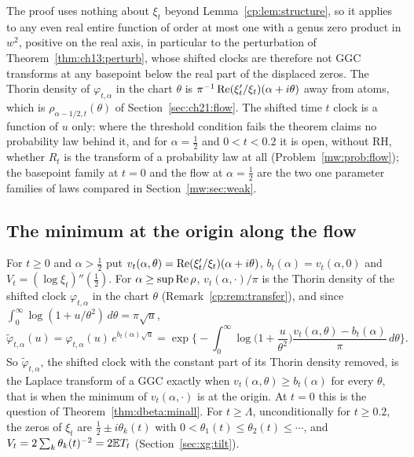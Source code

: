 \begin{remark}\label{cp:rem:transfer}
The proof uses nothing about $\xi_t$ beyond Lemma~\ref{cp:lem:structure}, so it applies to any even real entire function of order at most one with a genus zero product in $w^2$, positive on the real axis, in particular to the perturbation of Theorem~\ref{thm:ch13:perturb}, whose shifted clocks are therefore not GGC transforms at any basepoint below the real part of the displaced zeros. The Thorin density of $\varphi_{t,\alpha}$ in the chart $\theta$ is $\pi^{-1}\operatorname{Re}(\xi_t'/\xi_t)(\alpha+i\theta)$ away from atoms, which is $\rho_{\alpha-1/2,t}(\theta)$ of Section~\ref{sec:ch21:flow}. The shifted time $t$ clock is a function of $u$ only: where the threshold condition fails the theorem claims no probability law behind it, and for $\alpha=\frac12$ and $0<t<0.2$ it is open, without RH, whether $R_t$ is the transform of a probability law at all (Problem~\ref{mw:prob:flow}); the basepoint family at $t=0$ and the flow at $\alpha=\frac12$ are the two one parameter families of laws compared in Section~\ref{mw:sec:weak}.
\end{remark}

\subsection{The minimum at the origin along the flow}\label{cp:sec:minflow}

For $t\ge0$ and $\alpha>\frac12$ put $v_t(\alpha,\theta)=\operatorname{Re}(\xi_t'/\xi_t)(\alpha+i\theta)$, $b_t(\alpha)=v_t(\alpha,0)$ and $V_t=(\log\xi_t)''(\frac12)$. For $\alpha\ge\sup\operatorname{Re}\rho$, $v_t(\alpha,\cdot)/\pi$ is the Thorin density of the shifted clock $\varphi_{t,\alpha}$ in the chart $\theta$ (Remark~\ref{cp:rem:transfer}), and since $\int_0^\infty\log(1+u/\theta^2)\,d\theta=\pi\sqrt u$,
\[
\tilde\varphi_{t,\alpha}(u)=\varphi_{t,\alpha}(u)\,e^{b_t(\alpha)\sqrt u}=\exp\Big\{-\int_0^\infty\log\Big(1+\frac u{\theta^2}\Big)\frac{v_t(\alpha,\theta)-b_t(\alpha)}\pi\,d\theta\Big\}.
\]
So $\tilde\varphi_{t,\alpha}$, the shifted clock with the constant part of its Thorin density removed, is the Laplace transform of a GGC exactly when $v_t(\alpha,\theta)\ge b_t(\alpha)$ for every $\theta$, that is when the minimum of $v_t(\alpha,\cdot)$ is at the origin. At $t=0$ this is the question of Theorem~\ref{thm:dbeta:minall}. For $t\ge\Lambda$, unconditionally for $t\ge0.2$, the zeros of $\xi_t$ are $\frac12\pm i\theta_k(t)$ with $0<\theta_1(t)\le\theta_2(t)\le\cdots$, and $V_t=2\sum_k\theta_k(t)^{-2}=2\mathbb{E} T_t$ (Section~\ref{sec:xg:tilt}).

